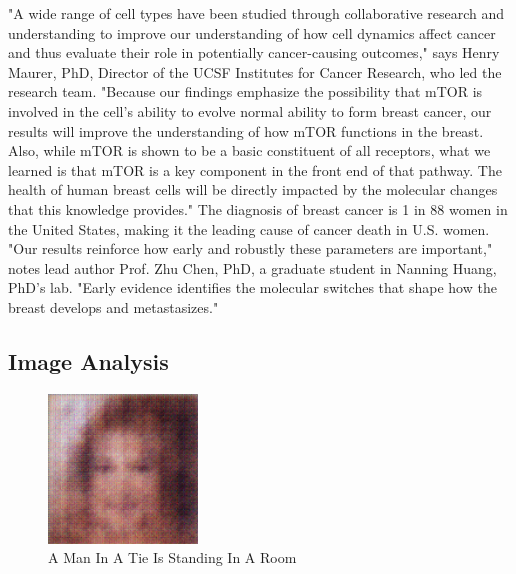 \documentclass{article}%
\begin{document}
"A wide range of cell types have been studied through collaborative research and understanding to improve our understanding of how cell dynamics affect cancer and thus evaluate their role in potentially cancer{-}causing outcomes," says Henry Maurer, PhD, Director of the UCSF Institutes for Cancer Research, who led the research team. "Because our findings emphasize the possibility that mTOR is involved in the cell's ability to evolve normal ability to form breast cancer, our results will improve the understanding of how mTOR functions in the breast. Also, while mTOR is shown to be a basic constituent of all receptors, what we learned is that mTOR is a key component in the front end of that pathway. The health of human breast cells will be directly impacted by the molecular changes that this knowledge provides."\newline%
The diagnosis of breast cancer is 1 in 88 women in the United States, making it the leading cause of cancer death in U.S. women.\newline%
"Our results reinforce how early and robustly these parameters are important," notes lead author Prof. Zhu Chen, PhD, a graduate student in Nanning Huang, PhD's lab. "Early evidence identifies the molecular switches that shape how the breast develops and metastasizes."

%
\subsection{Image Analysis}%
\label{subsec:ImageAnalysis}%


\begin{figure}[h!]%
\centering%
\includegraphics[width=150px]{500_fake_images/samples_5_408.png}%
\caption{A Man In A Tie Is Standing In A Room}%
\end{figure}

%
\end{document}
